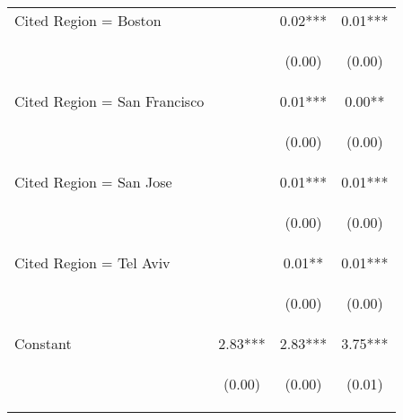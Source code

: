 \begin{center}
\begin{tabular}{lccc}
Cited Region = Boston &  & 0.02*** & 0.01*** \\
\vspace{4pt} & \begin{footnotesize}\end{footnotesize} & \begin{footnotesize}(0.00)\end{footnotesize} & \begin{footnotesize}(0.00)\end{footnotesize} \\
Cited Region = San Francisco &  & 0.01*** & 0.00** \\
\vspace{4pt} & \begin{footnotesize}\end{footnotesize} & \begin{footnotesize}(0.00)\end{footnotesize} & \begin{footnotesize}(0.00)\end{footnotesize} \\
Cited Region = San Jose &  & 0.01*** & 0.01*** \\
\vspace{4pt} & \begin{footnotesize}\end{footnotesize} & \begin{footnotesize}(0.00)\end{footnotesize} & \begin{footnotesize}(0.00)\end{footnotesize} \\
Cited Region = Tel Aviv &  & 0.01** & 0.01*** \\
\vspace{4pt} & \begin{footnotesize}\end{footnotesize} & \begin{footnotesize}(0.00)\end{footnotesize} & \begin{footnotesize}(0.00)\end{footnotesize} \\
Constant & 2.83*** & 2.83*** & 3.75*** \\
 & \begin{footnotesize}(0.00)\end{footnotesize} & \begin{footnotesize}(0.00)\end{footnotesize} & \begin{footnotesize}(0.01)\end{footnotesize} \\

\end{tabular}
\end{center}
